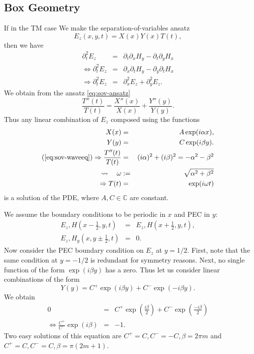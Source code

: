 \subsection{Box Geometry}

If in the TM case We make the separation-of-variables ansatz
\begin{equation}\label{eq:sov-ansatz}
  E_z(x, y, t) = X(x) Y(x) T(t),
\end{equation}
then we have
\begin{eqnarray*}
  \partial_t^2 E_z & = & \partial_t \partial_x H_y - \partial_t \partial_y
  H_x\\
  \Leftrightarrow \partial_t^2 E_z & = & \partial_x \partial_t H_y -
  \partial_y \partial_t H_x\\
  \Rightarrow \partial_t^2 E_z & = & \partial_x^2 E_z + \partial_y^2 E_z .
\end{eqnarray*}
We obtain from the ansatz \eqref{eq:sov-ansatz}
\begin{equation}\label{eq:sov-waveeq}
  \frac{T''(t)}{T(t)} = \frac{X''(x)}{X(x)} + \frac{Y''(y)}{Y(y)}.
\end{equation}
Thus any linear combination of $E_z$ composed using the functions
\begin{eqnarray*}
  X (x) & = & A \exp (i \alpha x),\\
  Y (y) & = & C \exp (i \beta y) .\\
  (\ref{eq:sov-waveeq}) \Rightarrow \frac{T'' (t)}{T (t)} & = & (i \alpha)^2 +
  (i \beta)^2 = - \alpha^2 - \beta^2\\
  \rightsquigarrow \quad \omega & := & \sqrt{\alpha^2 + \beta^2}\\
  \Rightarrow T (t) & = & \exp (i \omega t)
\end{eqnarray*}
is a solution of the PDE, where $A, C \in \mathbb{C}$ are constant.

We assume the boundary conditions to be periodic in $x$ and PEC in $y$:
\begin{eqnarray*}
  E_z, H \left( x - \frac{1}{2}, y, t \right) & = & E_z,
  H \left( x + \frac{1}{2}, y, t \right),\\
  E_z, H_y \left( x, y \pm \frac{1}{2}, t \right) & = & 0.
\end{eqnarray*}
Now consider the PEC boundary condition on $E_z$ at $y = 1 / 2$. First, note
that the same condition at $y = - 1 / 2$ is redundant for symmetry reasons.
Next, no single function of the form $\exp (i \beta y)$ has a zero. Thus let
us consider linear combinations of the form
\[ Y (y) = C^+ \exp (i \beta y) + C^- \exp (- i \beta y) . \]
We obtain
\begin{eqnarray*}
  0 & = & C^+ \exp \left( \frac{i \beta}{2} \right) + C^- \exp \left( \frac{-
  i \beta}{2} \right)\\
  \Leftrightarrow \frac{C^+}{C^-} \exp (i \beta) & = & - 1.
\end{eqnarray*}
Two easy solutions of this equation are $C^+ = C, C^- = - C, \beta = 2 \pi m$
and $C^+ = C, C^- = C, \beta = \pi (2 m + 1)$.

